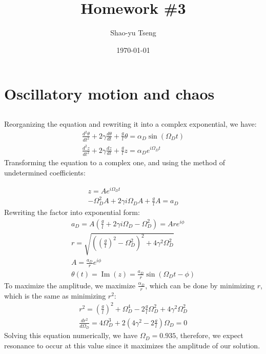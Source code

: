 \documentclass[10pt]{article}
\author{Shao-yu Tseng}
\date{\today}
\title{Homework \#3}
\renewcommand{\Im}{\operatorname{Im}}
\begin{document}
\maketitle

\setlength\parindent{0pt}

\section{Oscillatory motion and chaos}
\subsection{}

Reorganizing the equation and rewriting it into a complex exponential, we have:
\begin{align}
  \frac{d^2 \theta}{dt^2}  + 2\gamma \frac{d\theta}{dt} + \frac{g}{l}\theta = \alpha_{D} \sin (\Omega_{D}t) \\
  \frac{d^2 z}{dt^2}  + 2\gamma \frac{dz}{dt} + \frac{g}{l}z = \alpha_{D}  e^{i\Omega_{D} t}
\end{align}
  Transforming the equation to a complex one, and using the method of undetermined coefficients:

\begin{align}
  z = Ae^{i\Omega_{D} t} \\
  -\Omega_{D}^{2}A + 2 \gamma i \Omega_{D} A + \frac{g}{l}A = a_{D}
\end{align}
Rewriting the factor into exponential form:
\begin{align}
  a_{D} = A(\frac{g}{l} + 2\gamma i \Omega_{D} - \Omega_{D}^{2}) = Are^{i\phi} \\
  r = \sqrt{ ((\frac{g}{l})^{2} - \Omega_{D}^{2})^{2} + 4\gamma^{2}\Omega_{D}^{2}  }\\
  A = \frac{a_{D}}{r} e^{i\phi}\\
  \theta(t) = \Im (z) = \frac{a_{D}}{r} \sin(\Omega_{D} t - \phi)
\end{align}
To maximize the amplitude, we maximize \( \frac{\alpha_D}{r} \), which can be done by minimizing \( r \), which is the same as minimizing \( r^{2} \):
\begin{align}
  r^{2} = (\frac{g}{l})^{2} + \Omega_{D}^{4} - 2\frac{g}{l}\Omega_{D}^{2} + 4\gamma^{2}\Omega_{D}^{2} \\
  \frac{dr^{2}}{d\Omega_{D}} = 4 \Omega_{D}^{3} + 2(4\gamma^{2} - 2 \frac{g}{l}) \Omega_{D} = 0
\end{align}
Solving this equation numerically, we have \( \Omega_{D} = 0.935 \), therefore, we expect resonance to occur at this value since it maximizes the amplitude of our solution.
\end{document}
